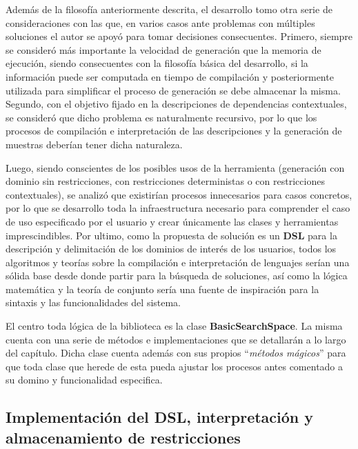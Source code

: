 Además de la filosofía anteriormente descrita, el desarrollo tomo otra serie de consideraciones con las que, en varios
casos ante problemas con múltiples soluciones el autor se apoyó para tomar decisiones consecuentes. Primero, siempre
se consideró más importante la velocidad de generación que la memoria de ejecución, siendo consecuentes con la
filosofía básica del desarrollo, si la información puede ser computada en tiempo de compilación y
posteriormente utilizada para simplificar el proceso de generación se debe almacenar la misma. Segundo, con el objetivo
fijado en la descripciones de dependencias contextuales, se consideró que dicho problema es naturalmente recursivo, por
lo que los procesos de compilación e interpretación de las descripciones y la generación de muestras deberían tener
dicha naturaleza.

Luego, siendo conscientes de los posibles usos de la herramienta (generación con dominio sin restricciones, con
restricciones deterministas o con restricciones contextuales), se analizó que existirían procesos innecesarios
para casos concretos, por lo que se desarrollo toda la infraestructura necesario para comprender el caso de uso
especificado por el usuario y crear únicamente las clases y herramientas imprescindibles. Por ultimo, como la
propuesta de solución es un {\bf DSL} para la descripción y delimitación de los dominios de interés de los usuarios,
todos los algoritmos y teorías sobre la compilación e interpretación de lenguajes serían una sólida base desde
donde partir para la búsqueda de soluciones, así como la lógica matemática y la teoría de conjunto sería una
fuente de inspiración para la sintaxis y las funcionalidades del sistema.

El centro toda lógica de la biblioteca es la clase {\bf BasicSearchSpace}. La misma cuenta con una
serie de métodos e implementaciones que se detallarán a lo largo del capítulo. Dicha clase cuenta además con
sus propios ``{\it métodos mágicos}'' para que toda clase que herede de esta pueda ajustar los procesos antes comentado
a su domino y funcionalidad especifica.


\subsection{Implementación del DSL, interpretación y almacenamiento de restricciones}


